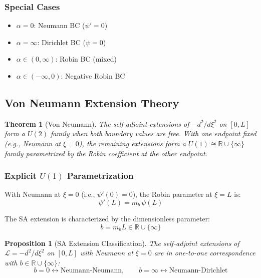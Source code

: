 \documentclass[11pt,a4paper]{article}
\newcommand{\mb}{m_b}
\theoremstyle{definition}
\theoremstyle{plain}
\newtheorem{proposition}{Proposition}[section]
\newtheorem{theorem}{Theorem}[section]
\theoremstyle{remark}
\begin{document}
\subsubsection{Special Cases}

\begin{itemize}
\item $\alpha = 0$: Neumann BC ($\psi' = 0$)
\item $\alpha = \infty$: Dirichlet BC ($\psi = 0$)
\item $\alpha \in (0, \infty)$: Robin BC (mixed)
\item $\alpha \in (-\infty, 0)$: Negative Robin BC
\end{itemize}

\subsection{Von Neumann Extension Theory}

\begin{theorem}[Von Neumann]
\label{thm:vonneumann}
The self-adjoint extensions of $-d^2/d\xi^2$ on $[0,L]$ form a $U(2)$ family
when both boundary values are free. With one endpoint fixed (e.g., Neumann at $\xi=0$),
the remaining extensions form a $U(1) \cong \mathbb{R} \cup \{\infty\}$ family
parametrized by the Robin coefficient at the other endpoint.
\end{theorem}

\subsubsection{Explicit $U(1)$ Parametrization}

With Neumann at $\xi = 0$ (i.e., $\psi'(0) = 0$), the Robin parameter at $\xi = L$ is:
\begin{equation}
\psi'(L) = \mb \, \psi(L)
\label{eq:robin-mb}
\end{equation}

The SA extension is characterized by the dimensionless parameter:
\begin{equation}
\boxed{b = \mb L \in \mathbb{R} \cup \{\infty\}}
\label{eq:b-SA-param}
\end{equation}

\begin{proposition}[SA Extension Classification]
\label{prop:SA-class}
The self-adjoint extensions of $\mathcal{L} = -d^2/d\xi^2$ on $[0,L]$ with Neumann
at $\xi=0$ are in one-to-one correspondence with $b \in \mathbb{R} \cup \{\infty\}$:
\begin{equation}
b = 0 \leftrightarrow \text{Neumann-Neumann}, \qquad
b = \infty \leftrightarrow \text{Neumann-Dirichlet}
\label{eq:SA-limits}
\end{equation}
\end{proposition}
\end{document}
